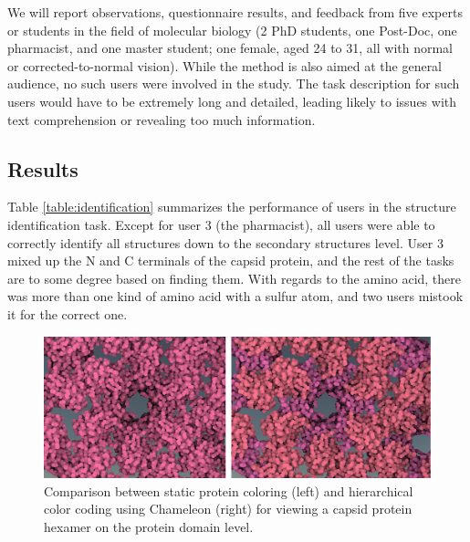 \documentclass{egpubl}
\begin{document}
	
	We will report observations, questionnaire results, and feedback from five experts or students in the field of molecular biology (2 PhD students, one Post-Doc, one pharmacist, and one master student; one female, aged 24 to 31, all with normal or corrected-to-normal vision). 
	While the method is also aimed at the general audience, no such users were involved in the study. 
	The task description for such users would have to be extremely long and detailed, leading likely to issues with text comprehension or revealing too much information. 
	
	\subsection{Results}
	
	Table \ref{table:identification} summarizes the performance of users in the structure identification task. 
	Except for user 3 (the pharmacist), all users were able to correctly identify all structures down to the secondary structures level. 
	User 3 mixed up the N and C terminals of the capsid protein, and the rest of the tasks are to some degree based on finding them.
	With regards to the amino acid, there was more than one kind of amino acid with a sulfur atom, and two users mistook it for the correct one.
	
	
	
	\begin{figure}
		\centering
		\includegraphics[width=1\linewidth]{Figures/comparison}
		\caption{Comparison between static protein coloring (left) and hierarchical color coding using Chameleon (right) for viewing a capsid protein hexamer on the protein domain level. }
		\label{fig:comparison}
	\end{figure}
	
\end{document}
